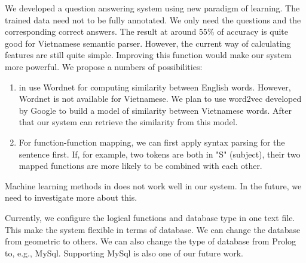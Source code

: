 \label{sec:conclusion}
We developed a question answering system using new paradigm of learning. The trained data need not to be fully annotated. We only need the questions and the corresponding correct answers. The result at around $55\%$ of accuracy is quite good for Vietnamese semantic parser. However, the current way of calculating features are still quite simple. Improving this function would make our system more powerful. We propose a numbers of possibilities:
\begin{enumerate}
  \item \citeauthor{Clarke:2010:DSP:1870568.1870571} in \cite{Clarke:2010:DSP:1870568.1870571} use Wordnet for computing similarity between English words. However, Wordnet is not available for Vietnamese. We plan to use word2vec developed by Google to build a model of similarity between Vietnamese words. After that our system can retrieve the similarity from this model.
  \item For function-function mapping, we can first apply syntax parsing for the sentence first. If, for example, two tokens are both in "S" (subject), their two mapped functions are more likely to be combined with each other. 
\end{enumerate} 

Machine learning methods in \cite{Clarke:2010:DSP:1870568.1870571} does not work well in our system. In the future, we need to investigate more about this.

Currently, we configure the logical functions and database type in one text file. This make the system flexible in terms of database. We can change the database from geometric to others. We can also change the type of database from Prolog to, e.g., MySql. Supporting MySql is also one of our future work.
